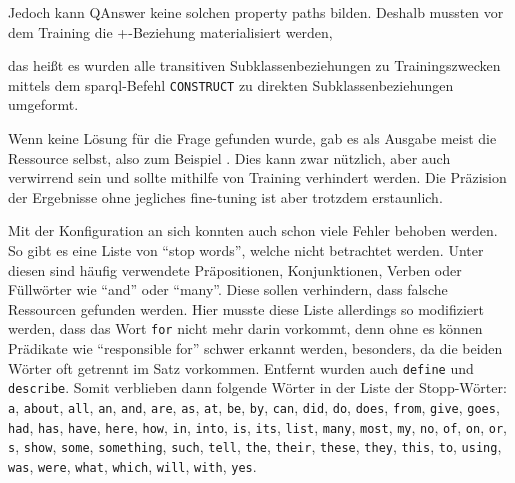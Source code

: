 Jedoch kann QAnswer keine solchen property paths bilden.
Deshalb mussten vor dem Training die +-Beziehung materialisiert werden,

das heißt es wurden alle transitiven Subklassenbeziehungen zu Trainingszwecken mittels dem \ac{sparql}-Befehl \texttt{CONSTRUCT} zu direkten Subklassenbeziehungen umgeformt. %

Wenn keine Lösung für die Frage gefunden wurde, gab es als Ausgabe meist die Ressource selbst, also zum Beispiel .
Dies kann zwar nützlich, aber auch verwirrend sein und sollte mithilfe von Training verhindert werden.
Die Präzision der Ergebnisse ohne jegliches fine-tuning ist aber trotzdem erstaunlich.

Mit der Konfiguration an sich konnten auch schon viele Fehler behoben werden.
So gibt es eine Liste von \enquote{stop words}, welche nicht betrachtet werden.
Unter diesen sind häufig verwendete Präpositionen, Konjunktionen, Verben oder Füllwörter wie \enquote{and} oder \enquote{many}.
Diese sollen verhindern, dass falsche Ressourcen gefunden werden.
Hier musste diese Liste allerdings so modifiziert werden, dass das Wort \texttt{for} nicht mehr darin vorkommt, denn ohne es können Prädikate wie \enquote{responsible for} schwer erkannt werden,
besonders, da die beiden Wörter oft getrennt im Satz vorkommen.
Entfernt wurden auch \texttt{define} und \texttt{describe}.
Somit verblieben dann folgende Wörter in der Liste der Stopp-Wörter:
\texttt{a}, \texttt{about}, \texttt{all}, \texttt{an}, \texttt{and}, \texttt{are}, \texttt{as}, \texttt{at}, \texttt{be}, \texttt{by}, \texttt{can}, \texttt{did}, \texttt{do}, \texttt{does}, \texttt{from}, \texttt{give}, \texttt{goes}, \texttt{had}, \texttt{has}, \texttt{have}, \texttt{here}, \texttt{how}, \texttt{in}, \texttt{into}, \texttt{is}, \texttt{its}, \texttt{list}, \texttt{many}, \texttt{most}, \texttt{my}, \texttt{no}, \texttt{of}, \texttt{on}, \texttt{or}, \texttt{s}, \texttt{show}, \texttt{some}, \texttt{something}, \texttt{such}, \texttt{tell}, \texttt{the}, \texttt{their}, \texttt{these}, \texttt{they}, \texttt{this}, \texttt{to}, \texttt{using}, \texttt{was}, \texttt{were}, \texttt{what}, \texttt{which}, \texttt{will}, \texttt{with}, \texttt{yes}.

